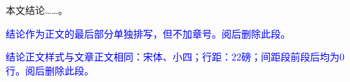 
\begin{conclusion}

  本文结论……\cite{张伯伟2002全唐五代诗格会考}。

  \textcolor{blue}{结论作为正文的最后部分单独排写，但不加章号。阅后删除此段。}

  \textcolor{blue}{结论正文样式与文章正文相同：宋体、小四；行距：22磅；间距段前段后均为0行。阅后删除此段。}
\end{conclusion}

